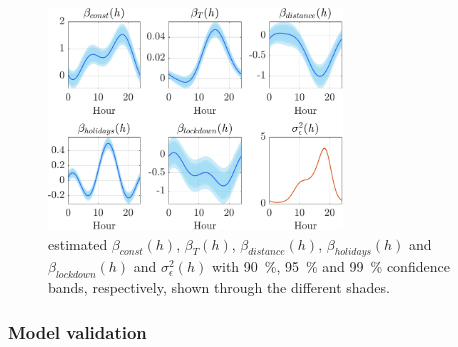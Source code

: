 \begin{figure}[h!]
	\centering
	\includegraphics[height=222px]{Images/Data analysis/f-HDGM/Chosen/Trend_beta_M.pdf}
	\caption[Estimated $\beta_{const}(h)$, $\beta_T(h)$, $\beta_{distance}(h)$, $\beta_{holidays}(h)$ and $\beta_{lockdown}(h)$]{estimated $\beta_{const}(h)$, $\beta_T(h)$, $\beta_{distance}(h)$, $\beta_{holidays}(h)$ and $\beta_{lockdown}(h)$ and $\sigma_{\epsilon}^2(h)$ with \SI{90}{\percent}, \SI{95}{\percent} and \SI{99}{\percent} confidence bands, respectively, shown through the different shades.}
	\label{Trend_beta_M}
\end{figure}

\subsubsection{Model validation}